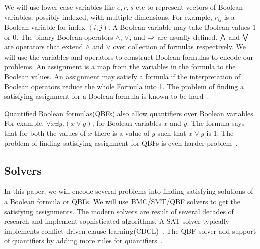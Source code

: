 We will use lower case variables like $e,r,s$ etc to represent vectors of
Boolean variables, possibly indexed, with multiple dimensions.
%
For example, $r_{ij}$ is a Boolean variable for index $(i,j)$.
%
%
A Boolean variable may take Boolean values $1$ or $0$.
%
The binary Boolean operators $\land$, $\lor$, and $\Rightarrow$ are usually defined.
%
$\bigwedge$ and $\bigvee$ are operators that extend $\land$ and $\lor$ over
collection of formulas respectively.
%
We will use the variables and operators to construct Boolean formulas to
encode our problems.
%
An assignment is a map from the variables in the formula to the Boolean values.
%
An assignment may satisfy a formula if the interpretation of Boolean operators
reduce the whole Formula into 1.
%
The problem of finding a satisfying assignment for a Boolean formula is
known to be hard~\cite{sat-hard}.
%

Quantified Boolean formulas(QBFs) also allow quantifiers over Boolean variables.
%
For example, $\forall x \exists y. (x \lor y)$, for Boolean variables $x$ and $y$.
%
The formula says that for both the values of $x$ there is a value of $y$
such that $x \lor y$ is 1.
%
The problem of finding satisfying assignment for QBFs is even harder problem~\cite{qbf-hard}.
%


\subsection{Solvers}
In this paper, we will encode several problems into finding satisfying
solutions of a Boolean formula or QBFs.
%
We will use BMC/SMT/QBF solvers to get the satisfying assignments.
%
The modern solvers are result of several decades of research
and implement sophisticated algorithms.
%
A SAT solver typically implements conflict-driven clause learning(CDCL)~\cite{cdcl}.
%
The QBF solver add support of quantifiers by adding more rules for
quantifiers~\cite{qbf}.

%
%

